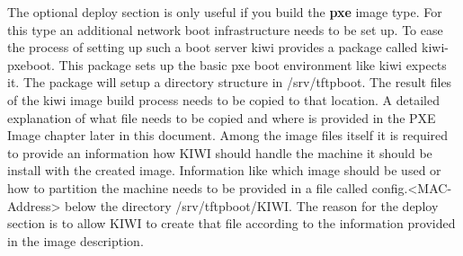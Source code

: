 The optional deploy section is only useful if you build the \textbf{pxe}
image type. For this type an additional network boot infrastructure needs
to be set up. To ease the process of setting up such a boot server kiwi
provides a package called kiwi-pxeboot. This package sets up the basic
pxe boot environment like kiwi expects it. The package will setup a
directory structure in /srv/tftpboot. The result files of the kiwi
image build process needs to be copied to that location. A detailed
explanation of what file needs to be copied and where is provided in
the PXE Image chapter later in this document. Among the image files itself
it is required to provide an information how KIWI should handle the
machine it should be install with the created image. Information like
which image should be used or how to partition the machine needs to
be provided in a file called config.<MAC-Address> below the directory
/srv/tftpboot/KIWI. The reason for the deploy section is to allow KIWI
to create that file according to the information provided in the image
description.

